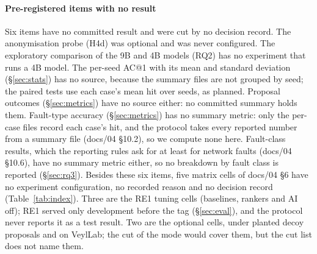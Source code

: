 \paragraph{Pre-registered items with no result}
Six items have no committed result and were cut by no decision record.
The anonymisation probe (H4d) was optional and was never configured.
The exploratory comparison of the 9B and 4B models (RQ2) has no experiment that runs a 4B model.
The per-seed AC@1 with its mean and standard deviation (\S\ref{sec:stats}) has no source, because the summary files are not grouped by seed; the paired tests use each case's mean hit over seeds, as planned.
Proposal outcomes (\S\ref{sec:metrics}) have no source either: no committed summary holds them.
Fault-type accuracy (\S\ref{sec:metrics}) has no summary metric: only the per-case files record each case's hit, and the protocol takes every reported number from a summary file (docs/04 §10.2), so we compute none here.
Fault-class results, which the reporting rules ask for at least for network faults (docs/04 §10.6), have no summary metric either, so no breakdown by fault class is reported (\S\ref{sec:rq3}).
Besides these six items, five matrix cells of docs/04 §6 have no experiment configuration, no recorded reason and no decision record (Table~\ref{tab:index}).
Three are the RE1 tuning cells (baselines, rankers and AI off); RE1 served only development before the tag (\S\ref{sec:eval}), and the protocol never reports it as a test result.
Two are the optional  cells, under planted decoy proposals and on VeylLab; the cut of the  mode would cover them, but the cut list does not name them.

